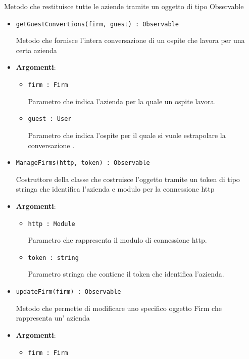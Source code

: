 \documentclass[../DefinizioneDiProdotto.tex]{subfiles}
\begin{document}
\begin{itemize}
\begin{itemize}
\begin{itemize}
	 Metodo che restituisce tutte le aziende tramite un oggetto di tipo Observable
	\end{itemize}\vspace{0.5em}
	\begin{itemize}
	\item \texttt{getGuestConvertions(firm, guest) : Observable}\

	 Metodo che fornisce l'intera conversazione di un ospite che lavora per una certa azienda

	\item \textbf{Argomenti}:
	\begin{itemize}
	\item \texttt{firm : Firm}\

	 Parametro che indica l'azienda per la quale un ospite lavora.
	\item \texttt{guest : User}\

	 Parametro che indica l'ospite per il quale si vuole estrapolare la conversazione .
	\end{itemize}
	\end{itemize}\vspace{0.5em}
	\begin{itemize}
	\item \texttt{ManageFirms(http, token) : Observable}\

	 Costruttore della classe che costruisce l'oggetto tramite un token di tipo stringa che identifica l'azienda e modulo per la connessione http

	\item \textbf{Argomenti}:
	\begin{itemize}
	\item \texttt{http : Module}\

	 Parametro che rappresenta il modulo di connessione http.
	\item \texttt{token : string}\

	 Parametro stringa che contiene il token che identifica l'azienda.
	\end{itemize}
	\end{itemize}\vspace{0.5em}
	\begin{itemize}
	\item \texttt{updateFirm(firm) : Observable}\

	 Metodo che permette di modificare uno specifico oggetto Firm che rappresenta un' azienda

	\item \textbf{Argomenti}:
	\begin{itemize}
	\item \texttt{firm : Firm}\


\end{itemize}
\end{itemize}
\end{itemize}
\end{itemize}
\end{document}
